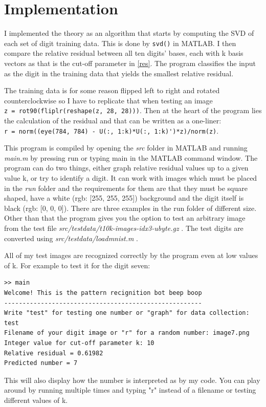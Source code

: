 \documentclass[notitlepage]{report}
\begin{document}
\newpage

\section{Implementation}

I implemented the theory as an algorithm that starts by computing the SVD of each set of digit training data. This is done by \verb|svd()| in MATLAB. I then compare the relative residual between all ten digits' bases, each with k basis vectors as that is the cut-off parameter in \eqref{res}. The program classifies the input as the digit in the training data that yields the smallest relative residual. 

The training data is for some reason flipped left to right and rotated counterclockwise so I have to replicate that when testing an image \\
\verb|z = rot90(fliplr(reshape(z, 28, 28)))|. Then at the heart of the program lies the calculation of the residual and that can be written as a one-liner:\\ 
\verb|r = norm((eye(784, 784) - U(:, 1:k)*U(:, 1:k)')*z)/norm(z)|.

This program is compiled by opening the \textit{src} folder in MATLAB and running \textit{main.m} by pressing run or typing main in the MATLAB command window. The program can do two things, either graph relative residual values up to a given value k, or try to identify a digit. It can work with images which must be placed in the \textit{run} folder and the requirements for them are that they must be square shaped, have a white (rgb: [255, 255, 255]) background and the digit itself is black (rgb: [0, 0, 0]). There are three examples in the run folder of different size. Other than that the program gives you the option to test an arbitrary image from the test file \textit{src/testdata/t10k-images-idx3-ubyte.gz} \cite{nistdata}. The test digits are converted using \textit{src/testdata/loadmnist.m} \cite{loadmnist}.

All of my test images are recognized correctly by the program even at low values of k. For example to test it for the digit seven:
\begin{verbatim}
>> main
Welcome! This is the pattern recignition bot beep boop
------------------------------------------------------
Write "test" for testing one number or "graph" for data collection: test
Filename of your digit image or "r" for a random number: image7.png
Integer value for cut-off parameter k: 10
Relative residual = 0.61982
Predicted number = 7
\end{verbatim}
This will also display how the number is interpreted as by my code. You can play around by running multiple times and typing "r" instead of a filename or testing different values of k.
\end{document}
